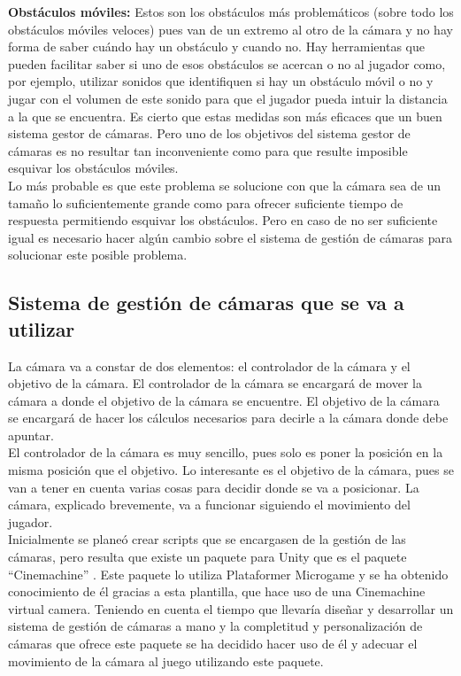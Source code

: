 \textbf{Obstáculos móviles:} Estos son los obstáculos más problemáticos (sobre todo los obstáculos móviles veloces) pues van de un extremo al otro de la cámara y no hay forma de saber cuándo hay un obstáculo y cuando no. Hay herramientas que pueden facilitar saber si uno de esos obstáculos se acercan o no al jugador como, por ejemplo, utilizar sonidos que identifiquen si hay un obstáculo móvil o no y jugar con el volumen de este sonido para que el jugador pueda intuir la distancia a la que se encuentra. Es cierto que estas medidas son más eficaces que un buen sistema gestor de cámaras. Pero uno de los objetivos del sistema gestor de cámaras es no resultar tan inconveniente como para que resulte imposible esquivar los obstáculos móviles.\\
Lo más probable es que este problema se solucione con que la cámara sea de un tamaño lo suficientemente grande como para ofrecer suficiente tiempo de respuesta permitiendo esquivar los obstáculos. Pero en caso de no ser suficiente igual es necesario hacer algún cambio sobre el sistema de gestión de cámaras para solucionar este posible problema.

\subsection{Sistema de gestión de cámaras que se va a utilizar}
La cámara va a constar de dos elementos: el controlador de la cámara y el objetivo de la cámara. El controlador de la cámara se encargará de mover la cámara a donde el objetivo de la cámara se encuentre. El objetivo de la cámara se encargará de hacer los cálculos necesarios para decirle a la cámara donde debe apuntar.\\
El controlador de la cámara es muy sencillo, pues solo es poner la posición en la misma posición que el objetivo. Lo interesante es el objetivo de la cámara, pues se van a tener en cuenta varias cosas para decidir donde se va a posicionar. La cámara, explicado brevemente, va a funcionar siguiendo el movimiento del jugador.\\
Inicialmente se planeó crear scripts que se encargasen de la gestión de las cámaras, pero resulta que existe un paquete para Unity que es el paquete “Cinemachine” \cite{PaqueteCinemachine}. Este paquete lo utiliza Plataformer Microgame y se ha obtenido conocimiento de él gracias a esta plantilla, que hace uso de una Cinemachine virtual camera. Teniendo en cuenta el tiempo que llevaría diseñar y desarrollar un sistema de gestión de cámaras a mano y la completitud y personalización de cámaras que ofrece este paquete se ha decidido hacer uso de él y adecuar el movimiento de la cámara al juego utilizando este paquete.

